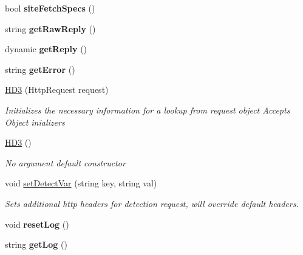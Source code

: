 \begin{DoxyCompactItemize}
\item 
\hypertarget{class_h_d3_1_1_h_d3_ae8d86be9f088829ebe42214cfb26672e}{bool {\bfseries site\+Fetch\+Specs} ()}\label{class_h_d3_1_1_h_d3_ae8d86be9f088829ebe42214cfb26672e}

\item 
\hypertarget{class_h_d3_1_1_h_d3_a08cdeab81f9bddbfb126a7321ea2fd8c}{string {\bfseries get\+Raw\+Reply} ()}\label{class_h_d3_1_1_h_d3_a08cdeab81f9bddbfb126a7321ea2fd8c}

\item 
\hypertarget{class_h_d3_1_1_h_d3_ad79fcc6a7b1e5d38abc7219af87b3a2f}{dynamic {\bfseries get\+Reply} ()}\label{class_h_d3_1_1_h_d3_ad79fcc6a7b1e5d38abc7219af87b3a2f}

\item 
\hypertarget{class_h_d3_1_1_h_d3_a3dc243815bb91775b05d6fb148959983}{string {\bfseries get\+Error} ()}\label{class_h_d3_1_1_h_d3_a3dc243815bb91775b05d6fb148959983}

\item 
\hyperlink{class_h_d3_1_1_h_d3_a0a238bb9c0e43132312e5c863292c577}{H\+D3} (Http\+Request request)
\begin{DoxyCompactList}\small\item\em Initializes the necessary information for a lookup from request object Accepts Object inializers \end{DoxyCompactList}\item 
\hyperlink{class_h_d3_1_1_h_d3_a6f369b558b21414a20af987df0007a75}{H\+D3} ()
\begin{DoxyCompactList}\small\item\em No argument default constructor \end{DoxyCompactList}\item 
void \hyperlink{class_h_d3_1_1_h_d3_a658104a63e4bac0a909cdcfed8c2d49b}{set\+Detect\+Var} (string key, string val)
\begin{DoxyCompactList}\small\item\em Sets additional http headers for detection request, will override default headers.\end{DoxyCompactList}\item 
\hypertarget{class_h_d3_1_1_h_d3_a92e1a5bec8573497497bb7e4082a6b5c}{void {\bfseries reset\+Log} ()}\label{class_h_d3_1_1_h_d3_a92e1a5bec8573497497bb7e4082a6b5c}

\item 
\hypertarget{class_h_d3_1_1_h_d3_a2436e33681884291c6ad1b2ee112e17b}{string {\bfseries get\+Log} ()}\label{class_h_d3_1_1_h_d3_a2436e33681884291c6ad1b2ee112e17b}


\end{DoxyCompactItemize}
